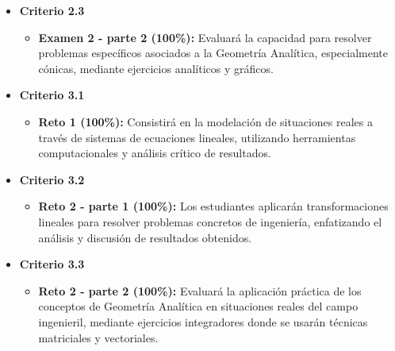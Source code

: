 \documentclass[a4,11pt]{aleph-notas}
\begin{document}
\begin{itemize}[leftmargin=*]
    \item \textbf{Criterio 2.3}
        \begin{itemize}[leftmargin=*]
            \item \textbf{Examen 2 - parte 2 (100\%):} Evaluará la capacidad para resolver problemas específicos asociados a la Geometría Analítica, especialmente cónicas, mediante ejercicios analíticos y gráficos.
        \end{itemize}

    \item \textbf{Criterio 3.1}
        \begin{itemize}[leftmargin=*]
            \item \textbf{Reto 1 (100\%):} Consistirá en la modelación de situaciones reales a través de sistemas de ecuaciones lineales, utilizando herramientas computacionales y análisis crítico de resultados.
        \end{itemize}

    \item \textbf{Criterio 3.2}
        \begin{itemize}[leftmargin=*]
            \item \textbf{Reto 2 - parte 1 (100\%):} Los estudiantes aplicarán transformaciones lineales para resolver problemas concretos de ingeniería, enfatizando el análisis y discusión de resultados obtenidos.
        \end{itemize}

    \item \textbf{Criterio 3.3}
        \begin{itemize}[leftmargin=*]
            \item \textbf{Reto 2 - parte 2 (100\%):} Evaluará la aplicación práctica de los conceptos de Geometría Analítica en situaciones reales del campo ingenieril, mediante ejercicios integradores donde se usarán técnicas matriciales y vectoriales.
        \end{itemize}
\end{itemize}
\end{document}
